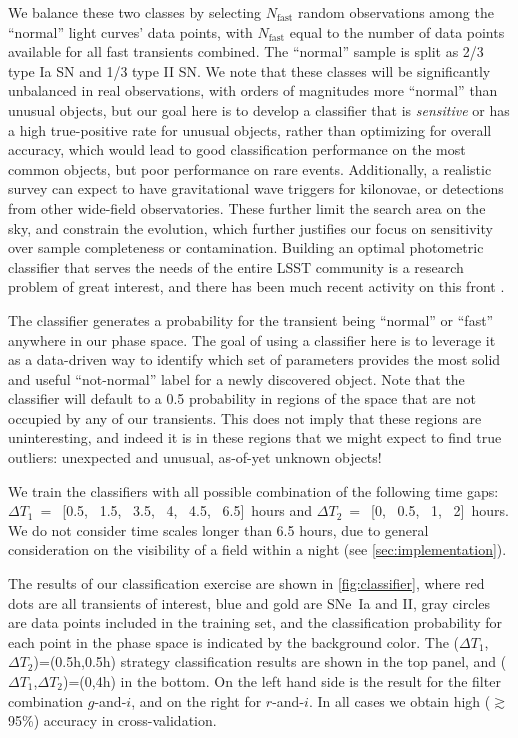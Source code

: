 \documentclass[letterpaper,longauthor,trackchanges,twocolumn,onecolappendix,sort&compress]{aastex62}
\newcommand{\dtone}{\ensuremath{\Delta T_1}}
\newcommand{\dttwo}{\ensuremath{\Delta T_2}}
\begin{document}
We balance these two classes by selecting  $N_\mathrm{fast}$ random observations among the ``normal'' light curves' data points, with $N_\mathrm{fast}$ equal to the number of data points available for all fast transients combined. The ``normal'' sample is split as 2/3 type Ia SN and 1/3 type II SN.  We note that these classes will be significantly unbalanced in real observations, with orders of magnitudes more ``normal'' than unusual objects, but our goal here is to develop a classifier that is \emph{sensitive} or has a high true-positive rate for unusual objects, rather than optimizing for overall accuracy, which would lead to good classification performance on the most common objects, but poor performance on rare events. Additionally, a realistic survey can expect to have gravitational wave triggers for kilonovae, or detections from other wide-field observatories. These further limit the search area on the sky, and constrain the evolution, which further justifies our focus on sensitivity over sample completeness or contamination. Building an optimal photometric classifier that serves the needs of the entire LSST community is a research problem of great interest, and there has been much recent activity on this front \citep[e.g.][]{plasticc}.

The classifier generates a probability for the transient being ``normal'' or ``fast'' anywhere in our phase space.  The goal of using a classifier here is to leverage it as a data-driven way to identify which set of parameters provides the most solid and useful ``not-normal'' label for a newly discovered object. Note that the classifier will default to a 0.5 probability in regions of the space that are not occupied by any of our transients. This does not imply that these regions are uninteresting, and indeed it is in these regions that we might expect to find true outliers: unexpected and unusual, as-of-yet unknown objects!

We train the classifiers with all possible combination of the following time gaps: 
$\dtone~=$~[0.5, ~1.5, ~3.5, ~4, ~4.5, ~6.5]~hours and 
$\dttwo~=$~[0, ~0.5, ~1, ~2]~hours. We do not consider time scales longer than 6.5 hours, due to general consideration on the visibility of a field within a night (see \autoref{sec:implementation}).

The results of our classification exercise are shown in \autoref{fig:classifier}, where red dots are all transients of interest, blue and gold are SNe~Ia and II, gray circles are data points included in the training set, and the classification probability for each point in the phase space is indicated by the background color. The (\dtone,\dttwo)=(0.5h,0.5h) strategy classification results are shown in the top panel, and (\dtone,\dttwo)=(0,4h) in the bottom.
On the left hand side is the result for the filter combination $g$-and-$i$, and on the right for $r$-and-$i$. In all cases we obtain high ($\gtrsim$95\%) accuracy in cross-validation. 
\end{document}
